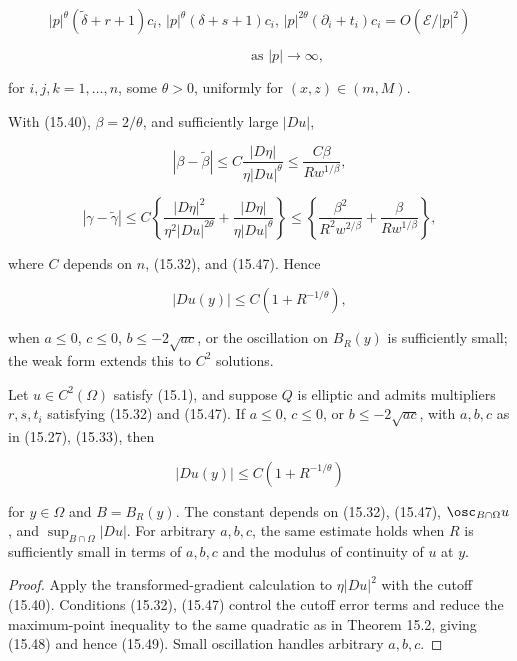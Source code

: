 \[
|p|^{\theta}(\tilde{\delta}+r+1)c_{i},\,|p|^{\theta}(\delta+s+1)c_{i},\,|p|^{2\theta}(\partial_{i}+t_{i})c_{i}=O(\mathscr{E}/|p|^{2})
\]

\[
\qquad\qquad\text{as } |p|\to\infty,
\]

for \(i,j,k=1,\ldots,n\), some \(\theta>0\), uniformly for \((x,z)\in(m,M)\).

With (15.40), \(\beta=2/\theta\), and sufficiently large \(|Du|\),

\[
|\beta-\tilde{\beta}|\leq C\frac{|D\eta|}{\eta|Du|^{\theta}}\leq \frac{C\beta}{Rw^{1/\beta}},
\]

\[
|\gamma-\tilde{\gamma}|\leq C\left\{\frac{|D\eta|^{2}}{\eta^{2}|Du|^{2\theta}}+\frac{|D\eta|}{\eta|Du|^{\theta}}\right\}\leq
\left\{\frac{\beta^{2}}{R^{2}w^{2/\beta}}+\frac{\beta}{Rw^{1/\beta}}\right\},
\]

where \(C\) depends on \(n\), (15.32), and (15.47). Hence

\begin{equation}
\tag{15.48}
|Du(y)|\leq C\left(1+R^{-1/\theta}\right),
\end{equation}


when \(a\le0\), \(c\le0\), \(b\le-2\sqrt{ac}\), or the oscillation on
\(B_R(y)\) is sufficiently small; the weak form extends this to \(C^2\) solutions.

\begin{theorem}\label{gilbarg-trudinger.thm.15.3.local-gradient-structure}
Let $u\in C^2(\Omega)$ satisfy (15.1), and suppose $Q$ is elliptic and admits multipliers
$r,s,t_i$ satisfying (15.32) and (15.47). If $a\leq0$, $c\leq0$, or
$b\leq-2\sqrt{ac}$, with $a,b,c$ as in (15.27), (15.33), then

\begin{equation}
\tag{15.49}
|Du(y)| \leq C(1 + R^{-1/\theta})
\end{equation}

for $y\in\Omega$ and $B=B_R(y)$. The constant depends on (15.32), (15.47),
$\osc_{B\cap\Omega}u$, and $\sup_{B\cap\Omega}|Du|$. For arbitrary $a,b,c$, the same
estimate holds when $R$ is sufficiently small in terms of $a,b,c$ and the modulus of
continuity of $u$ at $y$.
\end{theorem}
\begin{proof}
\sketch Apply the transformed-gradient calculation to $\eta|Du|^2$ with the cutoff
(15.40). Conditions (15.32), (15.47) control the cutoff error terms and reduce the
maximum-point inequality to the same quadratic as in Theorem 15.2, giving (15.48)
and hence (15.49). Small oscillation handles arbitrary $a,b,c$.
\end{proof}

